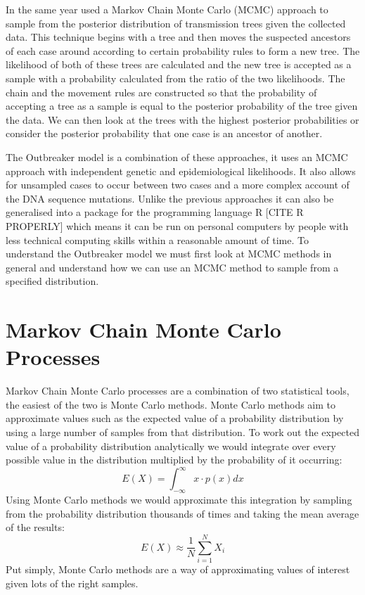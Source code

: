 \documentclass[11pt,a4paper]{report}
\begin{document}
In the same year \citet{Morelli12} used a Markov Chain Monte Carlo (MCMC) approach to sample from the posterior distribution of transmission trees given the collected data. This technique begins with a tree and then moves the suspected ancestors of each case around according to certain probability rules to form a new tree. The likelihood of both of these trees are calculated and the new tree is accepted as a sample with a probability calculated from the ratio of the two likelihoods. The chain and the movement rules are constructed so that the probability of accepting a tree as a sample is equal to the posterior probability of the tree given the data. We can then look at the trees with the highest posterior probabilities or consider the posterior probability that one case is an ancestor of another.

The Outbreaker model is a combination of these approaches, it uses an MCMC approach with independent genetic and epidemiological likelihoods. It also allows for unsampled cases to occur between two cases and a more complex account of the DNA sequence mutations. Unlike the previous approaches it can also be generalised into a package for the programming language R [CITE R PROPERLY] which means it can be run on personal computers by people with less technical computing skills within a reasonable amount of time. To understand the Outbreaker model we must first look at MCMC methods in general and understand how we can use an MCMC method to sample from a specified distribution.

\section{Markov Chain Monte Carlo Processes}
Markov Chain Monte Carlo processes are a combination of two statistical tools, the easiest of the two is Monte Carlo methods. Monte Carlo methods aim to approximate values such as the expected value of a probability distribution by using a large number of samples from that distribution. To work out the expected value of a probability distribution analytically we would integrate over every possible value in the distribution multiplied by the probability of it occurring:
\[ E(X) = \int_{-\infty}^{\infty} x \cdot p(x) dx \]
Using Monte Carlo methods we would approximate this integration by sampling from the probability distribution thousands of times and taking the mean average of the results:
\[ E(X) \approx \frac{1}{N}\sum_{i=1}^{N} X_i \] 
Put simply, Monte Carlo methods are a way of approximating values of interest given lots of the right samples.
\end{document}
